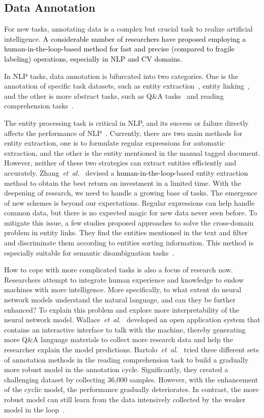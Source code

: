 \documentclass{article}
\newcommand\etal{\emph{et~al.}}
\newcommand{\p}[1]{\textcolor{black}{#1}}
\newcommand{\REO}[1]{\textcolor{black}{#1}}
\begin{document}
\subsection{Data Annotation}
\label{subsec:Data Annotation}

For new tasks, annotating data is a complex but crucial task to realize artificial intelligence. \p{A considerable number of researchers have proposed employing a \REO{human-in-the-loop}-based method for fast and precise (compared to fragile labeling) operations, especially in NLP and CV domains.}


In NLP tasks, data annotation is bifurcated into two categories. One is the annotation of specific task datasets, such as entity extraction~\cite{gentile2019explore, zhang2019invest}, entity linking~\cite{klie2020zero}, and the other is more abstract tasks, such as Q\&A tasks~\cite{wallace2019trick} and reading comprehension tasks~\cite{bartolo2020beat}.

The entity processing task is critical in NLP, and its success or failure directly affects the performance of NLP~\cite{martinez2020information}.
Currently, there are two main methods for entity extraction, one is to formulate regular expressions for automatic extraction, and the other is the entity mentioned in the manual tagged document.
However, neither of these two strategies can extract entities efficiently and accurately. Zhang~\etal~\cite{zhang2019invest} devised a \REO{human-in-the-loop}-based entity extraction method to obtain the best return on investment in a limited time.
With the deepening of research, we need to handle a growing base of tasks. The emergence of new schemes is beyond our expectations.
Regular expressions can help handle common data, but there is no expected magic for new data never seen before. To mitigate this issue, a few studies proposed approaches to solve the cross-domain problem in entity links.
They find the entities mentioned in the text and filter and discriminate them according to entities sorting information. This method is especially suitable for semantic disambiguation tasks~\cite{klie2020zero}.

How to cope with more complicated tasks is also a focus of research now. Researchers attempt to integrate human experience and knowledge to endow machines with more intelligence.
More specifically, to what extent do neural network models understand the natural language, and can they be further enhanced? To explain this problem and explore more interpretability of the neural network model.
Wallace~\etal~\cite{wallace2019trick} developed an open application system that contains an interactive interface to talk with the machine, thereby generating more Q\&A language materials to collect more research data and help the researcher explain the model predictions.
Bartolo~\etal~\cite{bartolo2020beat} tried three different sets of annotation methods in the reading comprehension task to build a gradually more robust model in the annotation cycle. Significantly, they created a challenging dataset by collecting 36,000 samples.
However, with the enhancement of the cyclic model, the performance gradually deteriorates. In contrast, the more robust model can still learn from the data intensively collected by the weaker model in the loop~\cite{ye2016face}.
\end{document}
